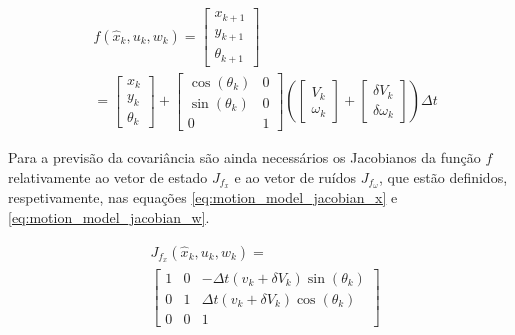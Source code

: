\documentclass[twocolumn]{article}
\begin{document}
\begin{equation}
    \begin{split}
        &f(\hat{x}_k,u_k,w_k) =
        \begin{bmatrix}
        x_{k+1} \\
        y_{k+1} \\
        \theta_{k+1} 
        \end{bmatrix} \\
        &= \begin{bmatrix}
        x_k \\
        y_k \\
        \theta_k
        \end{bmatrix} + 
        \begin{bmatrix}
        \cos(\theta_k) & 0 \\
        \sin(\theta_k) & 0 \\
        0 & 1
        \end{bmatrix} \left(
        \begin{bmatrix}
        V_k \\
        \omega_k
        \end{bmatrix} + 
        \begin{bmatrix}
        \delta V_k \\
        \delta \omega_k
        \end{bmatrix}
        \right) \Delta t 
    \end{split}
    \label{eq:motion_model}
\end{equation}

Para a previsão da covariância são ainda necessários os Jacobianos da função $f$ relativamente ao vetor de estado $J_{f_x}$ e ao vetor de ruídos $J_{f_\omega}$, que estão definidos, respetivamente, nas equações \ref{eq:motion_model_jacobian_x} e \ref{eq:motion_model_jacobian_w}.

\begin{equation}
    \begin{split}
        &J_{f_x}(\hat{x}_k,u_k,w_k) = \\
        &\left[\begin{matrix}1 & 0 & - \Delta t \left(v_{k} + \delta V_k \right) \sin{\left(\theta_{k} \right)}\\0 & 1 & \Delta t \left(v_{k} + \delta V_k \right) \cos{\left(\theta_{k} \right)}\\0 & 0 & 1\end{matrix}\right]
    \end{split}
    \label{eq:motion_model_jacobian_x}
\end{equation}
\end{document}
